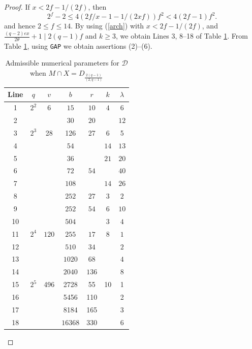 \documentclass[a4paper,twopage,reqno,12pt]{amsart}
\theoremstyle{definition}
\numberwithin{equation}{section}
\renewcommand{\leq}{\leqslant}
\renewcommand{\geq}{\geqslant}
\begin{document}
\begin{proof}
If $x<2f-1/(2f)$, then 
\begin{equation*}
2^{f}-2 \leq 4\left( 2f/x-1-1/(2xf)%
\right) f^{2}<4 \left( 2f-1\right) f^{2} \text{.} 
\end{equation*}
and hence $2\le f \le {14}$. By using (\ref{arch}) with $x<2f-1/(2f)$, 
and $\frac{\left( q-2\right) ex}{2\theta }+1\mid 2(q-1)f$ and $k\geq 3$, we obtain Lines 3, 8--18 of Table \ref{tab:q_even+/-}. From Table \ref{tab:q_even+/-}, using \texttt{GAP} we obtain assertions (2)--(6).
\begin{table}[htbp]
\tiny
    \centering
    \caption{\tiny Admissible numerical parameters for $\mathcal{D}$ when  $M\cap X=D_{\frac{2(q-1)}{(2,q-1)}} $}%
    \label{tab:q_even+/-}
    \begin{tabular}{ccccccc}
    \toprule
    Line & $q$ & $v$ & $b$ & $r$ & $k$ & $\lambda$ \\
       \midrule
       1 & $2^2$ & $6$ & $15$ & $10$ & $4$ & $6$ \\
       2 & &  & $30$ & $20$ & & $12$ \\
        3 & $2^3$ & 28 & 126 & 27 & 6 & 5\\
        4 &  &  & $54$  &  &  $14$ & $13$  \\
        5 & & & $36$  &   & $21$ & $20$  \\
        6 & & & $72$  &  $54$ &  & $40$  \\
        7 &  &  & $108$ &  & $14$ & $26$ \\
       8 &  &  & $252$ & $27$ & $3$ & $2$ \\
       9 &  &  & $252$ & $54$ & $6$ & $10$ \\
       10 &         &   &   $504$ &       & $3$ & $4$ \\ 
        11 & $2^4$&  $120$    & $255$ & $17$ &   $8$  & $1$ \\
        12& &      & $510$ & $34$ &    & $2$ \\
       13 & &     & $1020$ & $68$ &    & $4$ \\
       14 &           &      & $2040$ & $136$ &     & $8$ \\
       15 & $2^5$ & 496 & 2728 & 55 & 10 & 1\\
       16 &  &  & 5456 & 110 & & 2\\
       17 & & & 8184 & 165 &  & 3\\
       18 &  &  & %
       $16368$ & $330$ &  & $6$ \\

\end{tabular}
\end{table}
\end{proof}
\end{document}
